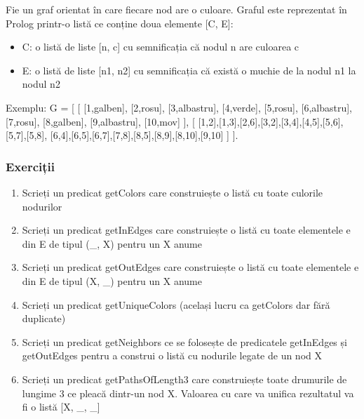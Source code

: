 Fie un graf orientat în care fiecare nod are o culoare.
Graful este reprezentat în Prolog printr-o listă ce conține doua elemente [C, E]:
\begin{itemize}
	\item  C: o listă de liste [n, c] cu semnificația că nodul n are culoarea c
	\item  E: o listă de liste [n1, n2] cu semnificația că există o muchie de la nodul n1 la nodul n2 
\end{itemize}
Exemplu:
G = [
[ [1,galben], [2,rosu], [3,albastru], [4,verde], [5,rosu], 
[6,albastru], [7,rosu], [8,galben], [9,albastru], 
[10,mov] ],
[ [1,2],[1,3],[2,6],[3,2],[3,4],[4,5],[5,6],[5,7],[5,8],
[6,4],[6,5],[6,7],[7,8],[8,5],[8,9],[8,10],[9,10] ] ].

\subsubsection*{ Exerciții }

\begin{enumerate}
	\item  Scrieți un predicat getColors care construiește o listă cu toate culorile nodurilor
	\item  Scrieți un predicat getInEdges care construiește o listă cu toate elementele e din E de tipul (\_, X) pentru un X anume
	\item  Scrieți un predicat getOutEdges care construiește o listă cu toate elementele e din E de tipul (X, \_) pentru un X anume
	\item  Scrieți un predicat getUniqueColors (același lucru ca getColors dar fără duplicate)
	\item  Scrieți un predicat getNeighbors ce se folosește de predicatele getInEdges și getOutEdges pentru a construi o listă cu nodurile legate de un nod X
	\item  Scrieți un predicat getPathsOfLength3 care construiește toate drumurile de lungime 3 ce pleacă dintr-un nod X. Valoarea cu care va unifica rezultatul va fi o listă [X, \_, \_]
\end{enumerate}
